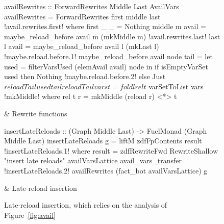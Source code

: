 \documentclass[blockstyle,preprint,natbib,nocopyrightspace]{sigplanconf}
\newcommand\figref[1]{Figure~\ref{fig:#1}}
\newcommand\figlabel[1]{\label{fig:#1}}
\begin{document}
\begin{figure*}
\begin{codetable}
\T\begin{code}
availRewrites :: ForwardRewrites Middle Last AvailVars
availRewrites = ForwardRewrites first middle last
!avail.rewrites.first!  where first _ _ = Nothing
        middle m avail = maybe_reload_before avail m (mkMiddle m)
!avail.rewrites.last!        last   l avail = maybe_reload_before avail l (mkLast l)
!maybe.reload.before.1!        maybe_reload_before avail node tail =
            let used = filterVarsUsed (elemAvail avail) node
            in  if isEmptyVarSet used then Nothing
!maybe.reload.before.2!                else Just $ reloadTail used tail
        reloadTail vars t = foldl rel t $ varSetToList vars
!mkMiddle!          where rel t r = mkMiddle (reload r) <*> t
\end{code}
\B
& Rewrite \mbox{functions}\\
\hline

\T\begin{code}
insertLateReloads :: (Graph Middle Last) -> FuelMonad (Graph Middle Last)
insertLateReloads g = liftM zdfFpContents result
!insertLateReloads.1!  where result = zdfRewriteFwd RewriteShallow "insert late reloads"
                               availVarsLattice avail_vars_transfer
!insertLateReloads.2!                               availRewrites (fact_bot availVarsLattice) g
\end{code}
& Late-reload insertion\\
\end{codetable}
\caption{Late-reload insertion, which relies on the analysis of \figref{avail}}
\figlabel{avail-rewrites}
\end{figure*}
\end{document}

